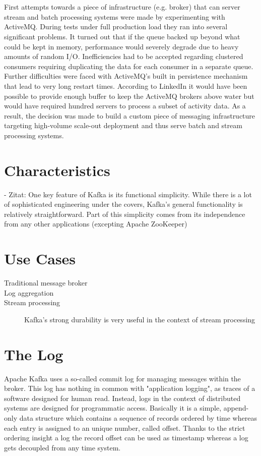 \\ \\
First attempts towards a piece of infrastructure (e.g. broker) that can server
stream and batch processing systems were made by experimenting with
ActiveMQ\cite{activemq}. During tests under full production load they ran into
several significant problems. It turned out that if the queue backed up beyond what could
be kept in memory, performance would severely degrade due to heavy amounts of
random I/O. Inefficiencies had to be accepted regarding clustered consumers
requiring duplicating the data for each consumer in a separate queue. Further
difficulties were faced with ActiveMQ's built in persistence mechanism that lead
to very long restart times. 
According to LinkedIn it would have been possible to provide enough buffer to
keep the ActiveMQ brokers above water but would have required hundred servers to
process a subset of activity data. As a result, the decision was made to build a
custom piece of messaging infrastructure targeting high-volume scale-out
deployment and thus serve batch and stream processing systems. 
\cite{goodhope2012building}


\section{Characteristics}
- Zitat: One key feature of Kafka is its functional simplicity. While there is a
lot of sophisticated engineering under the covers, Kafka’s general functionality
is relatively straightforward. Part of this simplicity comes from its
independence from any other applications (excepting Apache ZooKeeper)

\section{Use Cases}
\begin{description}
    \item [Traditional message broker]
    \item [Log aggregation]
    \item [Stream processing] Kafka's strong durability is very useful in the
        context of stream processing
\end{description}

\section{The Log}
\label{intro-kafka-log}
Apache Kafka uses a so-called commit log for managing messages within the
broker. This log has nothing in common with "application logging", as traces of
a software designed for human read. Instead, logs in the context of distributed systems
are designed for programmatic access. Basically it is a simple, append-only data
structure which contains a sequence of records ordered by time whereas each
entry is assigned to an unique number, called offset. Thanks to the strict
ordering insight a log the record offset can be used as timestamp whereas a log
gets decoupled from any time system. \cite{apachekafka} \cite{JK-TheLog}

